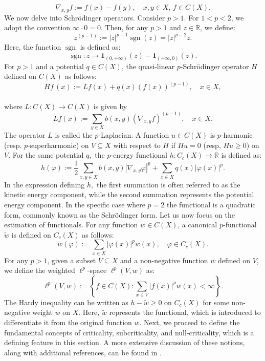 \documentclass[11pt]{amsart}
\newcommand{\1}{[1]}
\begin{document}
$$\nabla_{x,y} f := f(x) - f(y), \quad x, y \in X, \, f \in C(X).$$
We now delve into Schrödinger operators. Consider \(p > 1\). For \(1 < p < 2\), we adopt the convention \(\infty \cdot 0 = 0\). Then, for any \(p > 1\) and \(z \in \mathbb{R}\), we define:
$$ z^{(p-1)} := |z|^{p-1} \operatorname{sgn}(z) = |z|^{p-2} z.
$$
Here, the function $\operatorname{sgn} $ is defined as:
$$\operatorname{sgn}: z \to \mathbf{1}_{(0,+\infty)}(z) -\mathbf{1}_{(-\infty,0)}(z).$$ 
For \(p > 1\) and a potential \(q \in C(X)\), the quasi-linear $p$-Schrödinger operator $H$ defined on $C(X)$ as follows:
$$
Hf\,(x) := Lf(x) + q(x) (f(x))^{(p-1)}, \quad  x \in X,
$$
\phantom{.}\\
where $L: C(X) \to C(X)$ is given by \\
$$
Lf(x) := \sum_{y \in X} b(x, y) (\nabla_{x,y} f)^{(p-1)}, \quad  x \in X.
$$
The operator $L$ is called the $p$-Laplacian. A function $u \in C(X)$ is $p$-harmonic (resp. $p$-superharmonic) on $V \subseteq X$ with respect to $H$ if $Hu=0$ (resp, $Hu \geq 0$) on $V.$ For the same potential $q,$ the $p$-energy functional $h : C_c(X) \to \mathbb{R}$ is defined as:
$$
h(\varphi) := \frac{1}{2} \sum_{x,y \in X} b(x, y) |\nabla_{x,y}\varphi|^p + \sum_{x \in X} q(x) |\varphi(x)|^p.
$$
In the expression defining 
$h,$ the first summation is often referred to as the kinetic energy component, while the second summation represents the potential energy component. In the specific case where 
$p=2$ the functional is a quadratic form, commonly known as the Schrödinger form. Let us now focus on the estimation of functionals. For any function $w \in C(X)$, a canonical $p$-functional $\widetilde{w}$ is defined on $C_c(X)$ as follows:
$$\widetilde{w}(\varphi) := \sum_{x \in X} |\varphi(x)|^p w(x), \quad \varphi \in C_c(X).
$$  
For any $p > 1$, given a subset $V \subseteq X$ and a non-negative function $w$ defined on $V$, we define the weighted $\ell^p$-space $\ell^p(V, w)$ as:
$$
\ell^p(V, w) := \left\{ f \in C(X) : \sum_{x \in V} |f(x)|^p w(x) < \infty \right\}.
$$
The Hardy inequality can be written as $h - \widetilde{w} \geq 0$ on $C_c(X)$ for some non-negative weight $w$ on $X$. Here, $\widetilde{w}$ represents the functional, which is introduced to differentiate it from the original function $w$. Next, we proceed to define the fundamental concepts of criticality, subcriticality, and null-criticality, which is a defining feature in this section. A more extensive discussion of these notions, along with additional references, can be found in \cite{KPP20}. \\
\end{document}
